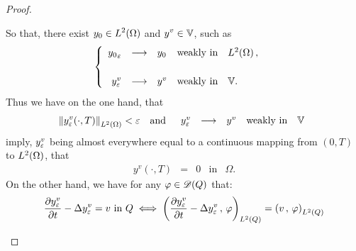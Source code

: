 \begin{proof}
\begin{enumerate}
            So that, there exist $\displaystyle y_{0}\in L^{2}\!\left({\Omega}\right)$
            and $\displaystyle y^{v}\in \mathbb{V}$, such as
            \begin{equation*}\label{eq:proof-thm-controllability-44}
                \begin{cases}\displaystyle
                    \begin{array}{rclll}
                        {y_{0}}_{\varepsilon} & \longrightarrow & y_{0} &
                        \text{weakly in} & L^{2}\!\left({\Omega}\right),\\
                        \\
                        y_{\varepsilon}^{v} & \longrightarrow & y^{v} &
                        \text{weakly in} & \mathbb{V}.
                    \end{array}
                \end{cases}
            \end{equation*}
            Thus we have on the one hand, that
            \begin{equation*}\label{eq:proof-thm-controllability-45}
                {\left\|{y_{\varepsilon}^{v}\!\left({\cdot,T}\right) }\right\|}_{L^{2}\left({\Omega}\right)} < \varepsilon
                \quad\text{and}\quad
                \begin{array}{rclll}
                    y_{\varepsilon}^{v} & \longrightarrow & y^{v} & \text{weakly
                    in} & \mathbb{V}
                \end{array}
            \end{equation*}
            imply, $y_{\varepsilon}^{v}$ being almost everywhere equal to a
            continuous mapping from $(0,T)$ to $L^{2}\!\left({\Omega}\right)$, that
            \begin{equation}\label{eq:proof-thm-controllability-46}
                \begin{array}{rclll}
                    y^{v}\!\left({\cdot, T}\right) & = & 0 & \text{in} &
                    \Omega.
                \end{array}
            \end{equation}
            On the other hand, we have for any $\varphi\in\mathscr{D}(Q)$ that:
            \begin{equation*}
                \begin{split}
                    {} & \primetemps{y_{\veps}^{v}} - \Delta y_{\veps}^{v}
                    = v\ \text{in}\ Q \iff \scalaireq{%
                        \primetemps{y_{\veps}^{v}} - \Delta y_{\veps}^{v}
                    }{\vphi} = \scalaireq{v}{\vphi}\\

\end{split}
\end{equation*}
\end{enumerate}
\end{proof}
